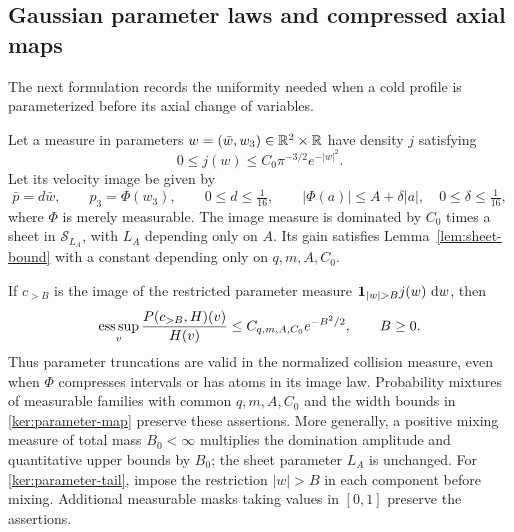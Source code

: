 \subsection{Gaussian parameter laws and compressed axial maps}

The next formulation records the uniformity needed when a cold
profile is parameterized before its axial change of variables.

\begin{lemma}
\label{ker:parameter-sheets}
Let a measure in parameters $w=(\bar w,w_3)\in\mathbb R^2\times\mathbb R$ have
density $j$ satisfying
\[
 0\leq j(w)\leq C_0\pi^{-3/2}e^{-|w|^2}.
\]
Let its velocity image be given by
\begin{equation}\label{ker:parameter-map}
 \bar p=d\bar w,\qquad p_3=\Phi(w_3),\qquad
 0\leq d\leq\tfrac1{16},\qquad
 |\Phi(a)|\leq A+\delta|a|,\quad0\leq\delta\leq\tfrac1{16},
\end{equation}
where $\Phi$ is merely measurable. The image measure is dominated
by $C_0$ times a sheet in $\mathcal S_{L_A}$, with $L_A$ depending
only on $A$. Its gain satisfies Lemma~\ref{lem:sheet-bound} with a
constant depending only on $q,m,A,C_0$.

If $c_{>B}$ is the image of the restricted parameter measure
$\ind_{|w|>B}j(w)\,\dd w$, then
\begin{equation}\label{ker:parameter-tail}
 \operatorname*{ess\,sup}_v\frac{P(c_{>B},H)(v)}{H(v)}
 \leq C_{q,m,A,C_0}e^{-B^2/2},\qquad B\geq0.
\end{equation}
Thus parameter truncations are valid in the normalized collision
measure, even when $\Phi$ compresses intervals or has atoms in its
image law. Probability mixtures of measurable families with common
$q,m,A,C_0$ and the width bounds in \eqref{ker:parameter-map} preserve
these assertions. More generally, a positive mixing measure of total
mass $B_0<\infty$ multiplies the domination amplitude and quantitative
upper bounds by $B_0$; the sheet parameter $L_A$ is unchanged.
For \eqref{ker:parameter-tail}, impose the restriction $|w|>B$ in
each component before mixing. Additional measurable masks taking
values in $[0,1]$ preserve the assertions.
\end{lemma}

